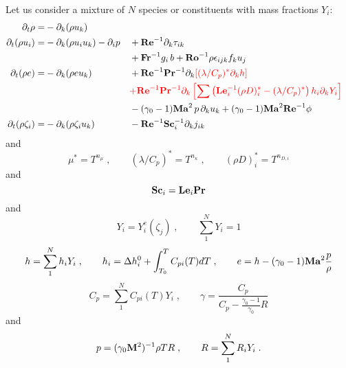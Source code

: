 Let us consider a mixture of $N$ species or constituents with mass fractions $Y_i$:
\begin{subequations}
  \begin{align}
    \partial_t \rho       =& -\partial_k (\rho u_k)                                                \\
    \partial_t (\rho u_i) =& -\partial_k (\rho u_i u_k )-\partial_i p
    && +\mathrm{\bf Re}^{-1}\partial_k \tau_{ik}                                                    \nonumber\\
    & && +\mathrm{\bf Fr}^{-1} g_i\,b +\mathrm{\bf Ro}^{-1}\rho\epsilon_{ijk} f_ku_j                                     \\
    \partial_t (\rho e)   =& -\partial_k (\rho e u_k )
    && +\mathrm{\bf Re}^{-1}\mathrm{\bf Pr}^{-1}\partial_k\color{red}{\left[(\lambda/C_p)^{*}\partial_kh\right]}\nonumber\\
    & && \color{red}{+\mathrm{\bf Re}^{-1}\mathrm{\bf Pr}^{-1} \partial_k\left[\sum\left(\mathrm{\bf Le}_i^{-1}(\rho D)_i^*
    -(\lambda/C_p)^*\right)h_i \partial_k  Y_i\right]}                                  \nonumber\\
    & && -(\gamma_0-1)\mathrm{\bf Ma}^2\,p\, \partial_k u_k  + (\gamma_0-1)\mathrm{\bf Ma}^2\mathrm{\bf Re}^{-1}\phi                 \\
    \partial_t (\rho \zeta_i)=& -\partial_k (\rho \zeta_i u_k)
    && -\mathrm{\bf Re}^{-1}\mathrm{\bf Sc}_i^{-1} \partial_k j_{ik}
  \end{align}
\end{subequations}
and
\begin{equation}
  \mu^{*} = T^{n_\mu}\;,\qquad (\lambda/C_p)^{*} = T^{n_\kappa} \;,\qquad (\rho
  D)_i^{*} = T^{n_{D,i}}
\end{equation}
and
\begin{equation}
  \mathrm{\bf Sc}_i = \mathrm{\bf Le}_i \mathrm{\bf Pr}
\end{equation}
and
\begin{equation}
  Y_i = Y^e_i(\zeta_j)\;, \qquad \sum^N_1 Y_i=1
\end{equation}
\begin{equation}
  h = \sum^N_1 h_{i} Y_i \;,\qquad h_{i} = \Delta h^0_i + \int^{T}_{T_0}
  C_{pi}(T) dT\;,\qquad e = h - (\gamma_0-1)\mathrm{\bf Ma}^2\frac{p}{\rho}
\end{equation}
\begin{equation}
  C_p = \sum^N_1 C_{pi}(T) Y_i\;,\qquad
  \gamma = \frac{C_p}{C_p-\frac{\gamma_0-1}{\gamma_0}R}
\end{equation}
and
\begin{equation}
  p = (\gamma_0 \mathrm{\bf M}^2)^{-1}\rho T R \;,\qquad
  R =\sum^N_1 R_iY_i\;.
\end{equation}
